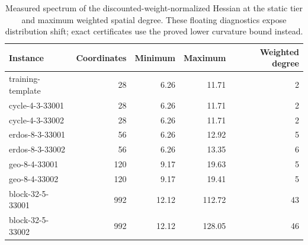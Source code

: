 \begin{table}[p]\centering\small
\caption{Measured spectrum of the discounted-weight-normalized Hessian at the static tier and maximum weighted spatial degree. These floating diagnostics expose distribution shift; exact certificates use the proved lower curvature bound instead.}\label{tab:r10-spectrum}
\begin{tabular}{lrrrr}\toprule
Instance & Coordinates & Minimum & Maximum & Weighted degree\\\midrule
training-template & 28 & 6.26 & 11.71 & 2 \\
cycle-4-3-33001 & 28 & 6.26 & 11.71 & 2 \\
cycle-4-3-33002 & 28 & 6.26 & 11.71 & 2 \\
erdos-8-3-33001 & 56 & 6.26 & 12.92 & 5 \\
erdos-8-3-33002 & 56 & 6.26 & 13.35 & 6 \\
geo-8-4-33001 & 120 & 9.17 & 19.63 & 5 \\
geo-8-4-33002 & 120 & 9.17 & 19.41 & 5 \\
block-32-5-33001 & 992 & 12.12 & 112.72 & 43 \\
block-32-5-33002 & 992 & 12.12 & 128.05 & 46 \\
\bottomrule\end{tabular}\end{table}
